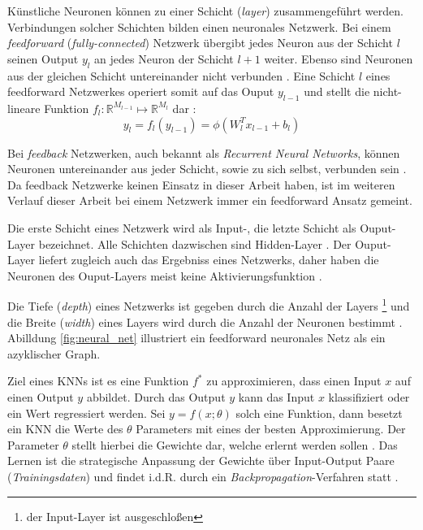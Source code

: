Künstliche Neuronen können zu einer Schicht (\textit{layer}) zusammengeführt werden. Verbindungen solcher Schichten bilden einen neuronales Netzwerk.
Bei einem \textit{feedforward} (\textit{fully-connected}) Netzwerk übergibt jedes Neuron aus der Schicht $l$ seinen Output $y_{l}$ an jedes Neuron der Schicht $l+1$ weiter. Ebenso sind Neuronen aus der gleichen Schicht untereinander nicht verbunden \cite{Goodfellow-et-al-2016}.
Eine Schicht $l$ eines feedforward Netzwerkes operiert somit auf das Ouput $y_{l-1}$ und stellt die nicht-lineare Funktion $f_l :  \mathbb{R}^{M_{l-1}} \mapsto \mathbb{R}^{M_l}$ dar \cite{bauckhageInformedMachineLearning}:
\begin{equation}
\label{eq:layer}
y_l = f_l(y_{l-1}) = \phi(W^T_lx_{l-1}+b_{l})
\end{equation}


Bei \textit{feedback} Netzwerken, auch bekannt als \textit{Recurrent Neural Networks}, können Neuronen untereinander aus jeder Schicht, sowie zu sich selbst, verbunden sein \cite{Goodfellow-et-al-2016}. Da feedback Netzwerke keinen Einsatz in dieser Arbeit haben, ist im weiteren Verlauf dieser Arbeit bei einem Netzwerk immer ein feedforward Ansatz gemeint.
 
Die erste Schicht eines Netzwerk wird als Input-, die letzte Schicht als Ouput-Layer bezeichnet. Alle Schichten dazwischen sind Hidden-Layer \cite{Goodfellow-et-al-2016}. Der Ouput-Layer liefert zugleich auch das Ergebniss eines Netzwerks, daher haben die Neuronen des Ouput-Layers meist keine Aktivierungsfunktion \cite{CS231nConvolutionalNeural}.


Die Tiefe (\textit{depth}) eines Netzwerks ist gegeben durch die Anzahl der Layers \footnote{der Input-Layer ist ausgeschloßen} und die Breite (\textit{width}) eines Layers wird durch die Anzahl der Neuronen bestimmt \cite{Goodfellow-et-al-2016}. 
Abilldung \ref{fig:neural_net} illustriert ein feedforward neuronales Netz als ein azyklischer Graph.


Ziel eines KNNs ist es eine Funktion $f^*$ zu approximieren, dass einen Input $x$ auf einen Output $y$ abbildet. Durch das Output $y$ kann das Input $x$ klassifiziert oder ein Wert regressiert werden. Sei $y = f(x; \theta)$  solch eine Funktion, dann besetzt ein KNN die Werte des $\theta$ Parameters mit eines der besten Approximierung. Der Parameter $\theta$ stellt hierbei die Gewichte dar, welche erlernt werden sollen \cite{Goodfellow-et-al-2016}. 
Das Lernen ist die strategische Anpassung der Gewichte über Input-Output Paare (\textit{Trainingsdaten}) und findet i.d.R. durch ein \textit{Backpropagation}-Verfahren statt \cite{Goodfellow-et-al-2016}. 

